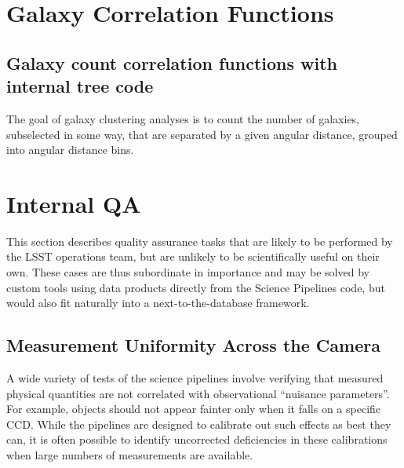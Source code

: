 \documentclass[DM,authoryear,toc]{lsstdoc}
\begin{document}

\section{Galaxy Correlation Functions}

\subsection{Galaxy count correlation functions with internal tree code}

The goal of galaxy clustering analyses is to count the number of galaxies,
subselected in some way, that are separated by a given angular distance,
grouped into angular distance bins.


\section{Internal QA}

This section describes quality assurance tasks that are likely to be performed
by the LSST operations team, but are unlikely to be scientifically useful on
their own. These cases are thus subordinate in importance and may be solved by
custom tools using data products directly from the Science Pipelines code, but
would also fit naturally into a next-to-the-database framework.

\subsection{Measurement Uniformity Across the Camera}

A wide variety of tests of the science pipelines involve verifying that measured
physical quantities are not correlated with observational ``nuisance
parameters''. For example, objects should not appear fainter only when it falls
on a specific CCD. While the pipelines are designed to calibrate out such
effects as best they can, it is often possible to identify uncorrected
deficiencies in these calibrations when large numbers of measurements are
available.
\end{document}
